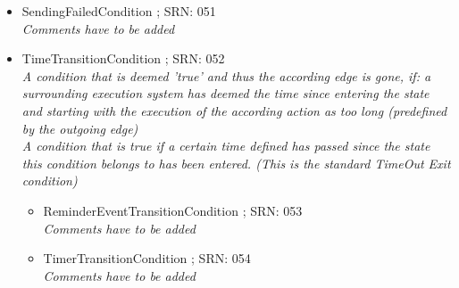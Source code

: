\begin{itemize}
\begin{itemize}
\begin{itemize}
\begin{itemize}
\begin{itemize}
				\item SendingFailedCondition ; SRN: 051 \\ \textit{Comments have to be added}
				\item TimeTransitionCondition ; SRN: 052 \\ \textit{A condition that is deemed 'true' and thus the according edge is gone, if: a surrounding execution system has deemed the time since entering the state and starting with the execution of the according action as too long (predefined by the outgoing edge) \\ A condition that is true if a certain time defined has passed since the state this condition belongs to has been entered. (This is the standard TimeOut Exit condition)}
				\begin{itemize} 
					\item ReminderEventTransitionCondition ; SRN: 053 \\ \textit{Comments have to be added}
					\item TimerTransitionCondition ; SRN: 054 \\ \textit{Comments have to be added}
				\end{itemize}
			\end{itemize}
		\end{itemize}
	\end{itemize}		
			

\end{itemize}
\end{itemize}
